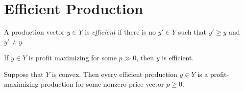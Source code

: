 \section{Efficient Production}

\begin{defn}
    A production vector $y \in Y$ is \emph{efficient} if there is no $y' \in Y$ such that $y' \geq y$ and $y' \neq y$.
\end{defn}

\begin{prop}
    If $y \in Y$ is profit maximizing for some $p \gg 0$, then $y$ is efficient.
\end{prop}

\begin{prop}
    Suppose that $Y$ is convex. Then every efficient production $y \in Y$ is a profit-maximizing production for some nonzero price vector $p \geq 0$.
\end{prop}
